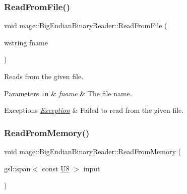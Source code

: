 \mbox{\label{classmage_1_1_big_endian_binary_reader_a68db676feaa42c1c3a9bf16d0680b04f}} 
\subsubsection{\texorpdfstring{Read\+From\+File()}{ReadFromFile()}}
{\footnotesize\ttfamily void mage\+::\+Big\+Endian\+Binary\+Reader\+::\+Read\+From\+File (\begin{DoxyParamCaption}\item[{wstring}]{fname }\end{DoxyParamCaption})}

Reads from the given file.


\begin{DoxyParams}[1]{Parameters}
\mbox{\tt in}  & {\em fname} & The file name. \\
\hline
\end{DoxyParams}

\begin{DoxyExceptions}{Exceptions}
{\em \mbox{\hyperlink{classmage_1_1_exception}{Exception}}} & Failed to read from the given file. \\
\hline
\end{DoxyExceptions}
\mbox{\label{classmage_1_1_big_endian_binary_reader_afc48490dca5042078726a1ec3fe7abe7}} 
\subsubsection{\texorpdfstring{Read\+From\+Memory()}{ReadFromMemory()}}
{\footnotesize\ttfamily void mage\+::\+Big\+Endian\+Binary\+Reader\+::\+Read\+From\+Memory (\begin{DoxyParamCaption}\item[{gsl\+::span$<$ const \mbox{\hyperlink{namespacemage_afc638980bc6154f15af5e2d93a0e0ea9}{U8}} $>$}]{input }\end{DoxyParamCaption})}


